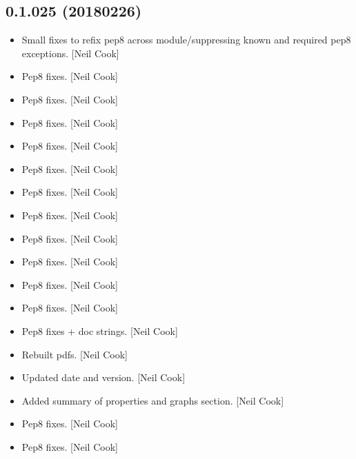 \documentclass[a4paper,10pt,english]{report}
\begin{document}
\subsection{0.1.025 (2018\sphinxhyphen{}02\sphinxhyphen{}26)}
\label{\detokenize{misc/changelog:id497}}\begin{itemize}
\item {} 
Small fixes to refix pep8 across module/suppressing known and required
pep8 exceptions. {[}Neil Cook{]}

\item {} 
Pep8 fixes. {[}Neil Cook{]}

\item {} 
Pep8 fixes. {[}Neil Cook{]}

\item {} 
Pep8 fixes. {[}Neil Cook{]}

\item {} 
Pep8 fixes. {[}Neil Cook{]}

\item {} 
Pep8 fixes. {[}Neil Cook{]}

\item {} 
Pep8 fixes. {[}Neil Cook{]}

\item {} 
Pep8 fixes. {[}Neil Cook{]}

\item {} 
Pep8 fixes. {[}Neil Cook{]}

\item {} 
Pep8 fixes. {[}Neil Cook{]}

\item {} 
Pep8 fixes. {[}Neil Cook{]}

\item {} 
Pep8 fixes. {[}Neil Cook{]}

\item {} 
Pep8 fixes + doc strings. {[}Neil Cook{]}

\item {} 
Rebuilt pdfs. {[}Neil Cook{]}

\item {} 
Updated date and version. {[}Neil Cook{]}

\item {} 
Added summary of properties and graphs section. {[}Neil Cook{]}

\item {} 
Pep8 fixes. {[}Neil Cook{]}

\item {} 
Pep8 fixes. {[}Neil Cook{]}


\end{itemize}
\end{document}
